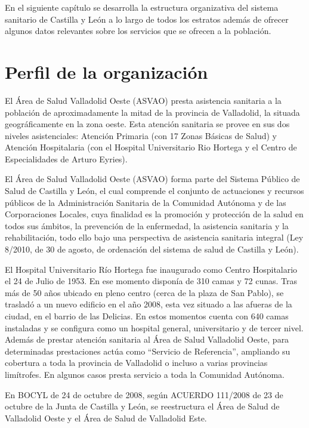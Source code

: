 En el siguiente capítulo se desarrolla la estructura organizativa del sistema sanitario de Castilla y León a lo largo de todos los estratos además de ofrecer algunos datos relevantes sobre los servicios que se ofrecen a la población.

\section{Perfil de la organización}

El Área de Salud Valladolid Oeste (ASVAO) presta asistencia sanitaria a la población de aproximadamente la mitad de la provincia de Valladolid, la situada geográficamente en la zona oeste. Esta atención sanitaria se provee en sus dos niveles asistenciales: Atención Primaria (con 17 Zonas Básicas de Salud) y Atención Hospitalaria (con el Hospital Universitario Rio Hortega y el Centro de Especialidades de Arturo Eyries).

El Área de Salud Valladolid Oeste (ASVAO) forma parte del Sistema Público de Salud de Castilla y León, el cual comprende el conjunto de actuaciones y recursos públicos de la Administración Sanitaria de la Comunidad Autónoma y de las Corporaciones Locales, cuya finalidad es la promoción y protección de la salud en todos sus ámbitos, la prevención de la enfermedad, la asistencia sanitaria y la rehabilitación, todo ello bajo una perspectiva de asistencia sanitaria integral (Ley 8/2010, de 30 de agosto, de ordenación del sistema de salud de Castilla y León).

El Hospital Universitario Río Hortega fue inaugurado como Centro Hospitalario el 24 de Julio de 1953. En ese momento disponía de 310 camas y 72 cunas. Tras más de 50 años ubicado en pleno centro (cerca de la plaza de San Pablo), se trasladó a un nuevo edificio en el año 2008, esta vez situado a las afueras de la ciudad, en el barrio de las Delicias. En estos momentos cuenta con 640 camas instaladas y se configura como un hospital general, universitario y de tercer nivel. Además de prestar atención sanitaria al Área de Salud Valladolid Oeste, para determinadas prestaciones actúa como “Servicio de Referencia”, ampliando su cobertura a toda la provincia de Valladolid o incluso a varias provincias limítrofes. En algunos casos presta servicio a toda la Comunidad Autónoma.

En BOCYL de 24 de octubre de 2008, según ACUERDO 111/2008 de 23 de octubre de la Junta de Castilla y León, se reestructura el Área de Salud de Valladolid Oeste y el Área de Salud de Valladolid Este.

